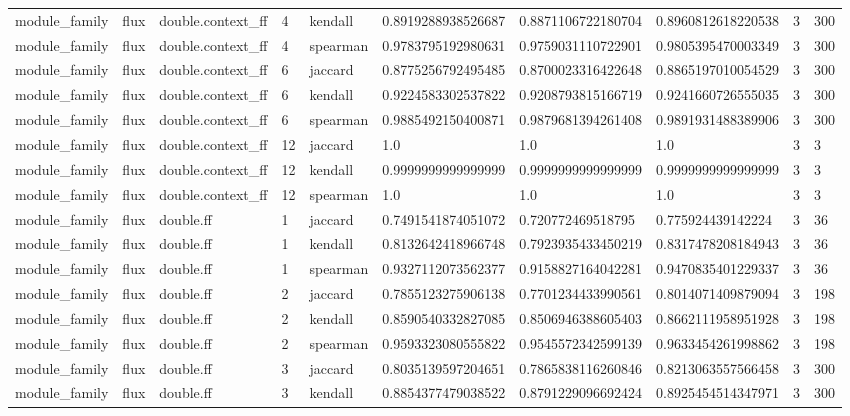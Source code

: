 \begin{tabular}{llllllllll}
module\_family & flux & double.context\_ff & 4 & kendall & 0.8919288938526687 & 0.8871106722180704 & 0.8960812618220538 & 3 & 300 \\
module\_family & flux & double.context\_ff & 4 & spearman & 0.9783795192980631 & 0.9759031110722901 & 0.9805395470003349 & 3 & 300 \\
module\_family & flux & double.context\_ff & 6 & jaccard & 0.8775256792495485 & 0.8700023316422648 & 0.8865197010054529 & 3 & 300 \\
module\_family & flux & double.context\_ff & 6 & kendall & 0.9224583302537822 & 0.9208793815166719 & 0.9241660726555035 & 3 & 300 \\
module\_family & flux & double.context\_ff & 6 & spearman & 0.9885492150400871 & 0.9879681394261408 & 0.9891931488389906 & 3 & 300 \\
module\_family & flux & double.context\_ff & 12 & jaccard & 1.0 & 1.0 & 1.0 & 3 & 3 \\
module\_family & flux & double.context\_ff & 12 & kendall & 0.9999999999999999 & 0.9999999999999999 & 0.9999999999999999 & 3 & 3 \\
module\_family & flux & double.context\_ff & 12 & spearman & 1.0 & 1.0 & 1.0 & 3 & 3 \\
module\_family & flux & double.ff & 1 & jaccard & 0.7491541874051072 & 0.720772469518795 & 0.775924439142224 & 3 & 36 \\
module\_family & flux & double.ff & 1 & kendall & 0.8132642418966748 & 0.7923935433450219 & 0.8317478208184943 & 3 & 36 \\
module\_family & flux & double.ff & 1 & spearman & 0.9327112073562377 & 0.9158827164042281 & 0.9470835401229337 & 3 & 36 \\
module\_family & flux & double.ff & 2 & jaccard & 0.7855123275906138 & 0.7701234433990561 & 0.8014071409879094 & 3 & 198 \\
module\_family & flux & double.ff & 2 & kendall & 0.8590540332827085 & 0.8506946388605403 & 0.8662111958951928 & 3 & 198 \\
module\_family & flux & double.ff & 2 & spearman & 0.9593323080555822 & 0.9545572342599139 & 0.9633454261998862 & 3 & 198 \\
module\_family & flux & double.ff & 3 & jaccard & 0.8035139597204651 & 0.7865838116260846 & 0.8213063557566458 & 3 & 300 \\
module\_family & flux & double.ff & 3 & kendall & 0.8854377479038522 & 0.8791229096692424 & 0.8925454514347971 & 3 & 300 \\

\end{tabular}
